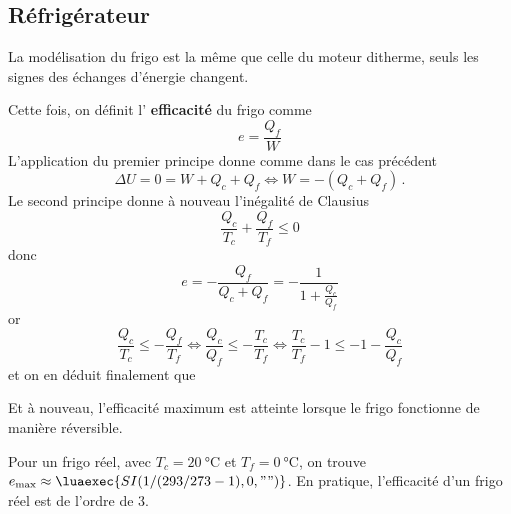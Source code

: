 \documentclass{cours}
\begin{document}
 \subsection{Réfrigérateur}%
 \label{sub:refrigerateur}

La modélisation du frigo est la même que celle du moteur ditherme, seuls les signes des échanges d'énergie changent.
 
\begin{center}
\end{center}
%
Cette fois, on définit l' \textbf{efficacité} du frigo comme 
\begin{equation}
  e = \frac{Q_f}{W}
\end{equation}
L'application du premier principe donne comme dans le cas précédent
\begin{equation}
  \Delta U = 0 = W + Q_c + Q_f \Leftrightarrow W=-(Q_c + Q_f)\, .
\end{equation}
Le second principe donne à nouveau l'inégalité de Clausius
\begin{equation}
 \frac{Q_c}{T_c}+ \frac{Q_f}{T_f}\leq 0  
\end{equation}
donc 
\begin{equation}
  e=-\frac{Q_f}{Q_c+Q_f}=-\frac{1}{1+\frac{Q_c}{Q_f}}
\end{equation}
or
\begin{equation}
  \frac{Q_c}{T_c}\leq -\frac{Q_f}{T_f} \Leftrightarrow \frac{Q_c}{Q_f} \leq - \frac{T_c}{T_f} \Leftrightarrow \frac{T_c}{T_f}-1 \leq -1-\frac{Q_c}{Q_f}
\end{equation}
et on en déduit finalement que 
\begin{eqencadre}
  \eta\leq {}
\end{eqencadre}  
Et à nouveau, l'efficacité maximum est atteinte lorsque le frigo fonctionne de manière réversible.

Pour un frigo réel, avec $T_c=\SI{20}{\celsius}$ et $T_f=\SI{0}{\celsius}$, on trouve $e_\text{max}\approx \luaexec{SI(1/(293/273-1), 0, "")}$. En pratique, l'efficacité d'un frigo réel est de l'ordre de 3. 
\end{document}
